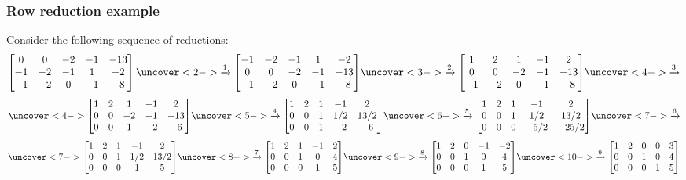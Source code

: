 \documentclass[9pt]{beamer}
\begin{document}
\begin{frame}[t]
 \frametitle{Row reduction example}
  Consider the following sequence of reductions:
  \bigskip
  {\tiny \[
   \bbm
    0 & 0 & -2 & -1 & -13 \\
   -1 & -2 & -1 & 1 & -2 \\
   -1 & -2 & 0 & -1 & -8
   \ebm  \uc<2->{\xra{1} 
   \bbm
   -1 & -2 & -1 & 1 & -2 \\
    0 & 0 & -2 & -1 & -13 \\
   -1 & -2 & 0 & -1 & -8
   \ebm}\uc<3->{  \xra{2} 
   \bbm
    1 & 2 & 1 & -1 & 2 \\
    0 & 0 & -2 & -1 & -13 \\
   -1 & -2 & 0 & -1 & -8
   \ebm}\uc<4->{  \xra{3}}
  \] \[ 
   \uc<4->{\bbm
    1 & 2 & 1 & -1 & 2 \\
    0 & 0 & -2 & -1 & -13 \\
    0 & 0 & 1 & -2 & -6
   \ebm}\uc<5->{ \xra{4} 
   \bbm
    1 & 2 & 1 & -1 & 2 \\
    0 & 0 & 1 & 1/2 & 13/2 \\
    0 & 0 & 1 & -2 & -6
   \ebm}\uc<6->{ \xra{5}
   \bbm
    1 & 2 & 1 & -1 & 2 \\
    0 & 0 & 1 & 1/2 & 13/2 \\
    0 & 0 & 0 & -5/2 & -25/2
   \ebm}\uc<7->{ \xra{6}} 
  \] \[
   \uc<7->{\bbm
    1 & 2 & 1 & -1 & 2 \\
    0 & 0 & 1 & 1/2 & 13/2 \\
    0 & 0 & 0 & 1 & 5
   \ebm}\uc<8->{ \xra{7}
   \bbm
    1 & 2 & 1 & -1 & 2 \\
    0 & 0 & 1 & 0 & 4 \\
    0 & 0 & 0 & 1 & 5
   \ebm}\uc<9->{ \xra{8}
   \bbm
    1 & 2 & 0 & -1 & -2 \\
    0 & 0 & 1 & 0 & 4 \\
    0 & 0 & 0 & 1 & 5
   \ebm}\uc<10->{ \xra{9} 
   \bbm
    1 & 2 & 0 & 0 & 3 \\
    0 & 0 & 1 & 0 & 4 \\
    0 & 0 & 0 & 1 & 5
   \ebm}
  \]}

  \bigskip

\end{frame}
\end{document}
